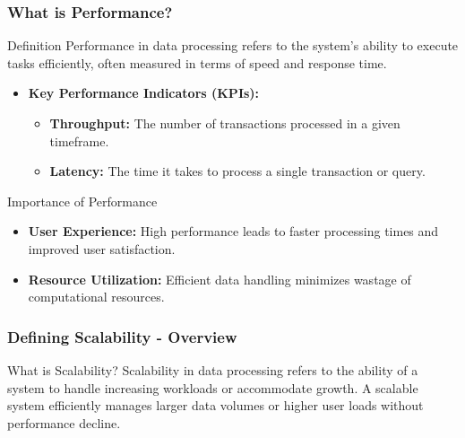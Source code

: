 \documentclass[aspectratio=169]{beamer}
\begin{document}
\begin{frame}[fragile]
    \frametitle{What is Performance?}
    \begin{block}{Definition}
        Performance in data processing refers to the system's ability to execute tasks efficiently, often measured in terms of speed and response time.
    \end{block}

    \begin{itemize}
        \item \textbf{Key Performance Indicators (KPIs):}
        \begin{itemize}
            \item \textbf{Throughput:} The number of transactions processed in a given timeframe.
            \item \textbf{Latency:} The time it takes to process a single transaction or query.
        \end{itemize}
    \end{itemize}

    \begin{block}{Importance of Performance}
        \begin{itemize}
            \item \textbf{User Experience:} High performance leads to faster processing times and improved user satisfaction.
            \item \textbf{Resource Utilization:} Efficient data handling minimizes wastage of computational resources.
        \end{itemize}
    \end{block}
\end{frame}

\begin{frame}[fragile]
    \frametitle{Defining Scalability - Overview}
    \begin{block}{What is Scalability?}
        Scalability in data processing refers to the ability of a system to handle increasing workloads or accommodate growth. A scalable system efficiently manages larger data volumes or higher user loads without performance decline.
    \end{block}
\end{frame}
\end{document}
